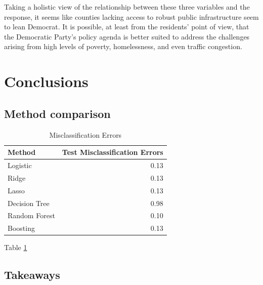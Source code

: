 \documentclass[
]{article}
\begin{document}
Taking a holistic view of the relationship between these three variables and the response, it seems like counties lacking access to robust public infrastructure seem to lean Democrat. It is possible, at least from the residents' point of view, that the Democratic Party's policy agenda is better suited to address the challenges arising from high levels of poverty, homelessness, and even traffic congestion.

\hypertarget{conclusions}{%
\section{Conclusions}\label{conclusions}}

\hypertarget{method-comparison}{%
\subsection{Method comparison}\label{method-comparison}}

\begin{table}

\caption{\label{tab:model-evaluation}Misclassification Errors}
\centering
\begin{tabular}[t]{lr}
\toprule
Method & Test Misclassification Errors\\
\midrule
Logistic & 0.13\\
Ridge & 0.13\\
Lasso & 0.13\\
Decision Tree & 0.98\\
Random Forest & 0.10\\
\addlinespace
Boosting & 0.13\\
\bottomrule
\end{tabular}
\end{table}

Table \ref{tab:model-evaluation}

\hypertarget{takeaways}{%
\subsection{Takeaways}\label{takeaways}}
\end{document}
